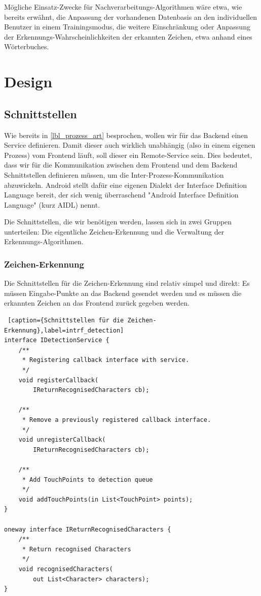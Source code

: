 Mögliche Einsatz-Zwecke für Nachverarbeitungs-Algorithmen wäre etwa, wie bereits erwähnt, die Anpassung der vorhandenen Datenbasis an den individuellen Benutzer in einem Trainingsmodus, die weitere Einschränkung oder Anpassung der Erkennungs-Wahrscheinlichkeiten der erkannten Zeichen, etwa anhand eines Wörterbuches.

\section{Design}

\subsection{Schnittstellen}

Wie bereits in \ref{lbl_prozess_art} besprochen, wollen wir für das Backend einen Service definieren. Damit dieser auch wirklich unabhängig (also in einem eigenen Prozess) vom Frontend läuft, soll dieser ein Remote-Service sein. Dies bedeutet, dass wir für die Kommunikation zwischen dem Frontend und dem Backend Schnittstellen definieren müssen, um die Inter-Prozess-Kommunikation abzuwickeln. Android stellt dafür eine eigenen Dialekt der Interface Definition Language bereit, der sich wenig überraschend "Android Interface Definition Language" (kurz AIDL) nennt.

Die Schnittstellen, die wir benötigen werden, lassen sich in zwei Gruppen unterteilen: Die eigentliche Zeichen-Erkennung und die Verwaltung der Erkennungs-Algorithmen.

\subsubsection{Zeichen-Erkennung}

Die Schnittstellen für die Zeichen-Erkennung sind relativ simpel und direkt: Es müssen Eingabe-Punkte an das Backend gesendet werden und es müssen die erkannten Zeichen an das Frontend zurück gegeben werden.

\begin{lstlisting} [caption={Schnittstellen für die Zeichen-Erkennung},label=intrf_detection]
interface IDetectionService {
    /**
     * Registering callback interface with service.
     */
    void registerCallback(
		IReturnRecognisedCharacters cb);
    
    /**
     * Remove a previously registered callback interface.
     */
    void unregisterCallback(
		IReturnRecognisedCharacters cb);
    
    /**
     * Add TouchPoints to detection queue
     */
    void addTouchPoints(in List<TouchPoint> points);
}

oneway interface IReturnRecognisedCharacters {
    /**
     * Return recognised Characters
     */
    void recognisedCharacters(
		out List<Character> characters);
}
\end{lstlisting}

